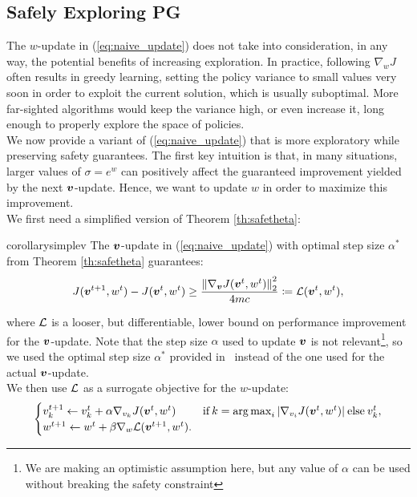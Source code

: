 \subsection{Safely Exploring PG}\label{sec:explore+safe}
The $w$-update in (\ref{eq:naive_update}) does not take into consideration, in any way, the potential benefits of increasing exploration. In practice, following $\nabla_{w}J$ often results in greedy learning, setting the policy variance to small values very soon in order to exploit the current solution, which is usually suboptimal. More far-sighted algorithms would keep the variance high, or even increase it, long enough to properly explore the space of policies. \\
We now provide a variant of (\ref{eq:naive_update}) that is more exploratory while preserving safety guarantees. The first key intuition is that, in many situations, larger values of $\sigma=e^w$ can positively affect the guaranteed improvement yielded by the next $\vv$-update. Hence, we want to update $w$ in order to maximize this improvement. \\
We first need a simplified version of Theorem \ref{th:safetheta}:
\begin{restatable}[]{corollary}{simplev}\label{th:simplev}
	The $\vv$-update in (\ref{eq:naive_update}) with optimal step size $\alpha^*$ from Theorem \ref{th:safetheta} guarantees:
	\begin{align*}
	J(\vv^{t+1},w^t) - J(\vv^t,w^t) \geq \frac{\norm[2]{\gradJ[\vv]{\vv^t,w^t}}^2}{4mc}
	\coloneqq \Deltav(\vv^t,w^t),
	\end{align*}
\end{restatable}
where $\Deltav$ is a looser, but differentiable, lower bound on performance improvement for the $\vv$-update. Note that the step size $\alpha$ used to update $\vv$ is not relevant\footnote{We are making an optimistic assumption here, but any value of $\alpha$ can be used without breaking the safety constraint}, so we used the optimal step size $\alpha^*$ provided in~\cite{adaptive_batch} instead of the one used for the actual $\vv$-update. \\
We then use $\Deltav$ as a surrogate objective for the $w$-update:
%
\begin{align}\label{up:exp}
\begin{cases}
v_{k}^{t+1} \gets v_{k}^t + \alpha\gradJ[v_{k}]{\vv^t,w^t}
& \text{if}\:k =  \argmax_i |\gradJ[v_i]{\vv^t, w^t}| \:\text{else}\:v_{k}^t,\\
w^{t+1} \gets w^t + \beta\gradDelta(\vv^{t+1}, w^t).
\end{cases}
\end{align}
